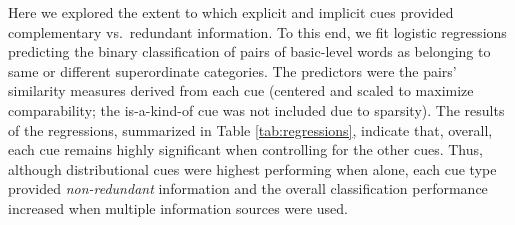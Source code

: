 \documentclass[english,,man,floatsintext]{apa6}
\begin{document}
Here we explored the extent to which explicit and implicit cues provided
complementary vs.~redundant information. To this end, we fit logistic
regressions predicting the binary classification of pairs of basic-level
words as belonging to same or different superordinate categories. The
predictors were the pairs' similarity measures derived from each cue (centered and scaled to maximize comparability; the is-a-kind-of cue was not included due to sparsity). The results of the regressions,
summarized in Table \ref{tab:regressions}, indicate that, overall, each cue remains highly significant when controlling for the other cues. Thus, although distributional cues were highest performing when alone, each cue type provided \emph{non-redundant} information and the overall classification performance increased when multiple information sources were used.
\end{document}
